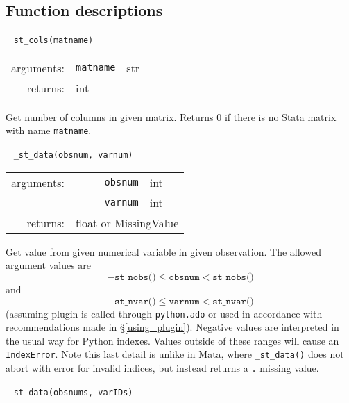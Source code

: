 \documentclass{article}
\begin{document}
\subsection{Function descriptions} \label{func_descript}
			
			
			\ \newline
			\noindent \lstinline$st_cols(matname)$
								
			\vspace{1.5mm}
			\noindent 
			\indent \begin{tabular}{rrl}
					arguments: & \texttt{matname} & str \\
					returns: & \multicolumn{2}{l}{int}
				\end{tabular}
								
			\vspace{1.5mm}
			\noindent Get number of columns in given matrix. Returns 0 if there is no Stata matrix with name \lstinline$matname$. \newline
			
			
			\ \newline
			\noindent \lstinline$_st_data(obsnum, varnum)$
								
			\vspace{1.5mm}
			\noindent 
			\indent \begin{tabular}{rrl}
					arguments: & \texttt{obsnum} & int \\
						& \texttt{varnum} & int \\
					returns: & \multicolumn{2}{l}{float or MissingValue}
				\end{tabular}
								
			\vspace{1.5mm}
			\noindent Get value from given numerical variable in given observation. The allowed argument values are 
			\[
				-\texttt{st\_nobs()} \leq \texttt{obsnum} < \texttt{st\_nobs()}
			\]
			and
			\[
				-\texttt{st\_nvar()} \leq \texttt{varnum} < \texttt{st\_nvar()}
			\]
			(assuming plugin is called through \lstinline$python.ado$ or used in accordance with recommendations made in \S\ref{using_plugin}). Negative values are interpreted in the usual way for Python indexes. Values outside of these ranges will cause an \lstinline$IndexError$. Note this last detail is unlike in Mata, where \lstinline{_st_data()} does not abort with error for invalid indices, but instead returns a \lstinline{.} missing value.
			\newline
			
			
			\ \newline
			\noindent \lstinline$st_data(obsnums, varIDs)$
								
\end{document}
